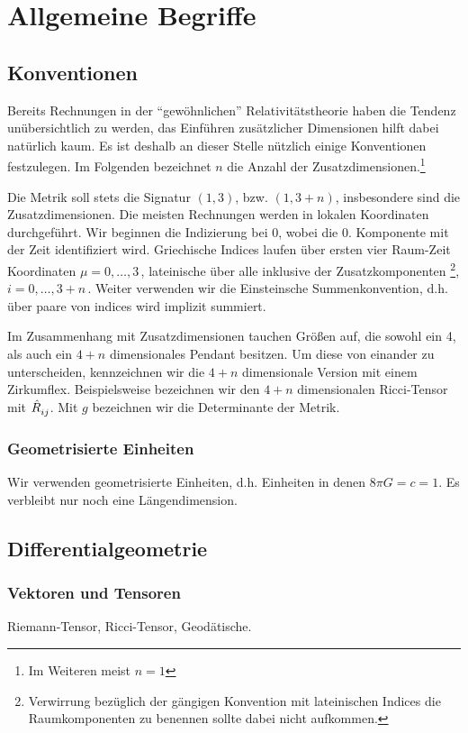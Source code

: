 \chapter{Allgemeine Begriffe}

\section{Konventionen}
Bereits Rechnungen in der "`gewöhnlichen"' Relativitätstheorie haben die Tendenz
unübersichtlich zu werden, das Einführen zusätzlicher Dimensionen hilft dabei
natürlich kaum.
Es ist deshalb an dieser Stelle nützlich einige Konventionen festzulegen. Im
Folgenden bezeichnet $n$ die Anzahl der Zusatzdimensionen.\footnote{Im Weiteren
meist $n=1$}

Die Metrik soll stets die Signatur $(1,3)$, bzw. $(1,3+n)$, insbesondere sind
die Zusatzdimensionen. Die meisten Rechnungen werden in lokalen Koordinaten
durchgeführt.
Wir beginnen die Indizierung bei 0, wobei die 0. Komponente mit der Zeit identifiziert wird.
Griechische Indices laufen über ersten vier Raum-Zeit Koordinaten
$\mu=0,\ldots,3\,$, lateinische über alle inklusive der
Zusatzkomponenten \footnote{Verwirrung bezüglich der gängigen Konvention
mit lateinischen Indices die Raumkomponenten zu benennen sollte dabei nicht
aufkommen.}, $i=0,\ldots,3+n\,$. Weiter verwenden wir die Einsteinsche
Summenkonvention, d.h. über paare von indices wird implizit summiert.

Im Zusammenhang mit Zusatzdimensionen tauchen Größen auf, die sowohl ein 4, als
auch ein $4+n$ dimensionales Pendant besitzen. Um diese von einander zu
unterscheiden, kennzeichnen wir die $4+n$ dimensionale Version mit einem
Zirkumflex. 
Beispielsweise bezeichnen wir den $4+n$ dimensionalen Ricci-Tensor mit
$\tensor{\hat{R}}{_i_j}$. Mit $g$ bezeichnen wir die Determinante der Metrik.
\subsection*{Geometrisierte Einheiten}
Wir verwenden geometrisierte Einheiten, d.h. Einheiten in denen
$8\pi G=c=1$. Es verbleibt nur noch eine Längendimension.
\section{Differentialgeometrie}
\subsection{Vektoren und Tensoren}
Riemann-Tensor, Ricci-Tensor, Geodätische.

